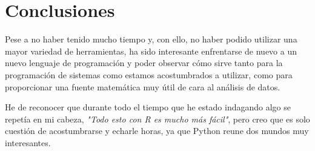 \documentclass[a4,11pt]{article}
\begin{document}
\newpage

\newpage

\newpage

\section{Conclusiones}\label{conc:conc}

Pese a no haber tenido mucho tiempo y, con ello, no haber podido utilizar una mayor variedad de herramientas, ha sido interesante enfrentarse de nuevo a un nuevo lenguaje de programación y poder observar cómo sirve tanto para la programación de sistemas como estamos acostumbrados a utilizar, como para proporcionar una fuente matemática muy útil de cara al análisis de datos.

He de reconocer que durante todo el tiempo que he estado indagando algo se repetía en mi cabeza, \emph{"Todo esto con R es mucho más fácil"}, pero creo que es solo cuestión de acostumbrarse y echarle horas, ya que Python reune dos mundos muy interesantes.



\end{document}
